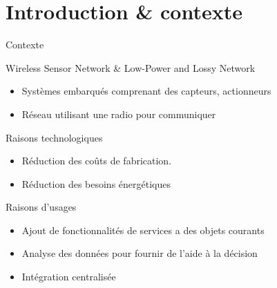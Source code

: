 \section{Introduction \& contexte}

\begin{frame}{Contexte}
  \begin{block}{Wireless Sensor Network \& Low-Power and Lossy Network}
    \begin{itemize}
      \item Systèmes embarqués comprenant des capteurs, actionneurs
      \item Réseau utilisant une radio pour communiquer
    \end{itemize}
  \end{block}

  \begin{block}{Raisons technologiques}
    \begin{itemize}
      \item Réduction des coûts de fabrication.
      \item Réduction des besoins énergétiques
    \end{itemize}
  \end{block}

  \begin{block}{Raisons d'usages}
    \begin{itemize}
      \item Ajout de fonctionnalités de services a des objets courants
      \item Analyse des données pour fournir de l'aide à la décision
      \item Intégration centralisée
    \end{itemize}
  \end{block}


\end{frame}

